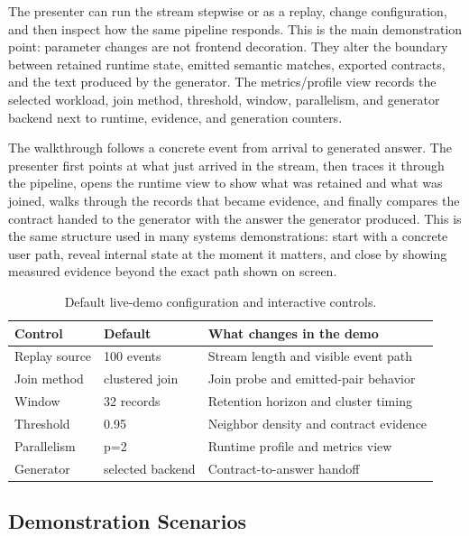 \documentclass[sigconf,anonymous]{acmart}
\begin{document}
The presenter can run the stream stepwise or as a replay, change configuration, and then inspect how the same pipeline responds. This is the main demonstration point: parameter changes are not frontend decoration. They alter the boundary between retained runtime state, emitted semantic matches, exported contracts, and the text produced by the generator. The metrics/profile view records the selected workload, join method, threshold, window, parallelism, and generator backend next to runtime, evidence, and generation counters.

The walkthrough follows a concrete event from arrival to generated answer. The presenter first points at what just arrived in the stream, then traces it through the pipeline, opens the runtime view to show what was retained and what was joined, walks through the records that became evidence, and finally compares the contract handed to the generator with the answer the generator produced. This is the same structure used in many systems demonstrations: start with a concrete user path, reveal internal state at the moment it matters, and close by showing measured evidence beyond the exact path shown on screen.

\begin{table}[t]
  \centering
  \caption{Default live-demo configuration and interactive controls.}
  \label{tab:controls}
  \scriptsize
  \setlength{\tabcolsep}{3pt}
  \begin{tabular}{@{}lll@{}}
    \toprule
    Control & Default & What changes in the demo \\
    \midrule
    Replay source & 100 events & Stream length and visible event path \\
    Join method & clustered join & Join probe and emitted-pair behavior \\
    Window & 32 records & Retention horizon and cluster timing \\
    Threshold & 0.95 & Neighbor density and contract evidence \\
    Parallelism & p=2 & Runtime profile and metrics view \\
    Generator & selected backend & Contract-to-answer handoff \\
    \bottomrule
  \end{tabular}
\end{table}

\subsection{Demonstration Scenarios}
\end{document}
